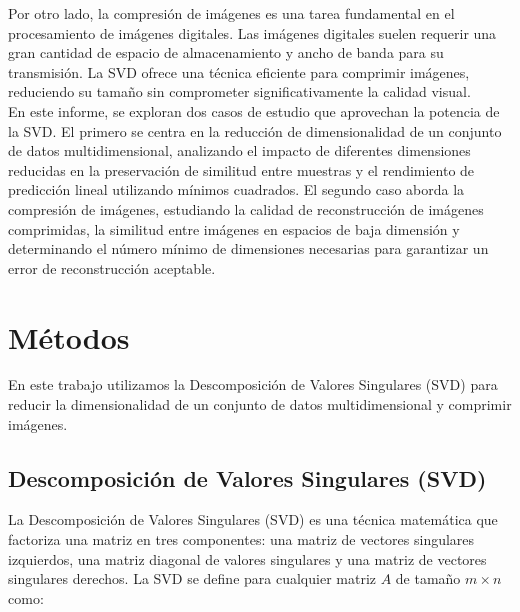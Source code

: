 \documentclass[12pt,a4]{article} %
\begin{document}
Por otro lado, la compresión de imágenes es una tarea fundamental en el procesamiento de imágenes digitales. Las imágenes digitales suelen requerir una gran cantidad de espacio de almacenamiento y ancho de banda para su transmisión. La SVD ofrece una técnica eficiente para comprimir imágenes, reduciendo su tamaño sin comprometer significativamente la calidad visual.
\\

En este informe, se exploran dos casos de estudio que aprovechan la potencia de la SVD. El primero se centra en la reducción de dimensionalidad de un conjunto de datos multidimensional, analizando el impacto de diferentes dimensiones reducidas en la preservación de similitud entre muestras y el rendimiento de predicción lineal utilizando mínimos cuadrados. El segundo caso aborda la compresión de imágenes, estudiando la calidad de reconstrucción de imágenes comprimidas, la similitud entre imágenes en espacios de baja dimensión y determinando el número mínimo de dimensiones necesarias para garantizar un error de reconstrucción aceptable.




\section{Métodos}
En este trabajo utilizamos la Descomposición de Valores Singulares (SVD) para reducir la dimensionalidad de un conjunto de datos multidimensional y comprimir imágenes. 

\subsection{Descomposición de Valores Singulares (SVD)}
\label{SVD}
La Descomposición de Valores Singulares (SVD) es una técnica matemática que factoriza una matriz en tres componentes: una matriz de vectores singulares izquierdos, una matriz diagonal de valores singulares y una matriz de vectores singulares derechos. La SVD se define para cualquier matriz \(A\) de tamaño \(m \times n\) como:
\end{document}
